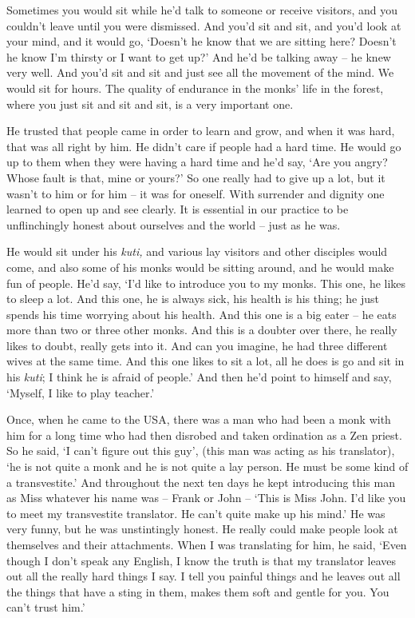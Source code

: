 Sometimes you would sit while he'd talk to someone or receive visitors, 
and you couldn't leave until you were dismissed. And you'd sit and sit, 
and you'd look at your mind, and it would go, `Doesn't he know that we
are sitting here? Doesn't he know I'm thirsty or I want to get up?' And
he'd be talking away -- he knew very well. And you'd sit and sit and
just see all the movement of the mind. We would sit for hours. The
quality of endurance in the monks' life in the forest, where you just
sit and sit and sit, is a very important one. 

He trusted that people came in order to learn and grow, and when it was
hard, that was all right by him. He didn't care if people had a hard
time. He would go up to them when they were having a hard time and he'd
say, `Are you angry? Whose fault is that, mine or yours?' So one really
had to give up a lot, but it wasn't to him or for him -- it was for
oneself. With surrender and dignity one learned to open up and see
clearly. It is essential in our practice to be unflinchingly honest
about ourselves and the world -- just as he was. 

He would sit under his \emph{kuti,} and various lay visitors and other
disciples would come, and also some of his monks would be sitting
around, and he would make fun of people. He'd say, `I'd like to
introduce you to my monks. This one, he likes to sleep a lot. And this
one, he is always sick, his health is his thing; he just spends his time
worrying about his health. And this one is a big eater -- he eats more
than two or three other monks. And this is a doubter over there, he
really likes to doubt, really gets into it. And can you imagine, he had
three different wives at the same time. And this one likes to sit a lot, 
all he does is go and sit in his \emph{kuti}; I think he is afraid of
people.' And then he'd point to himself and say, `Myself, I like to play
teacher.'

Once, when he came to the USA, there was a man who had been a monk with
him for a long time who had then disrobed and taken ordination as a Zen
priest. So he said, `I can't figure out this guy', (this man was acting
as his translator), `he is not quite a monk and he is not quite a lay
person. He must be some kind of a transvestite.' And throughout the next
ten days he kept introducing this man as Miss whatever his name was --
Frank or John -- `This is Miss John. I'd like you to meet my
transvestite translator. He can't quite make up his mind.' He was very
funny, but he was unstintingly honest. He really could make people look
at themselves and their attachments. When I was translating for him, he
said, `Even though I don't speak any English, I know the truth is that
my translator leaves out all the really hard things I say. I tell you
painful things and he leaves out all the things that have a sting in
them, makes them soft and gentle for you. You can't trust him.'

